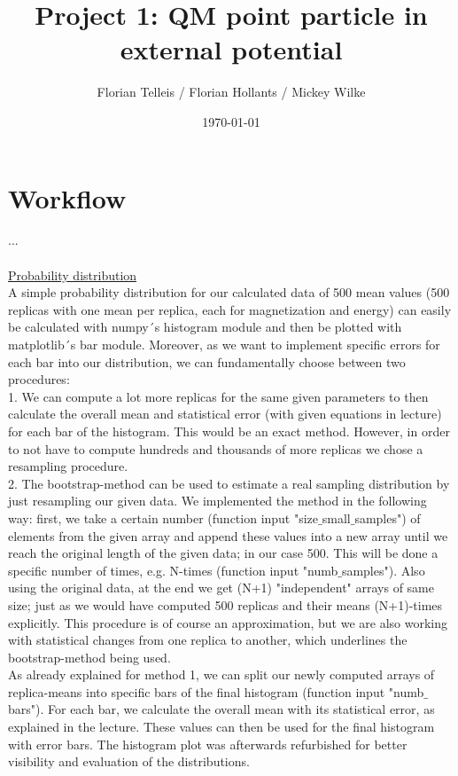 \documentclass[11pt, letterpaper, onecolumn]{article}
\title{Project 1: QM point particle in external potential}
\author{Florian Telleis / Florian Hollants / Mickey Wilke}
\date{\today}
\begin{document}
	
	
	\tableofcontents
	
	
	
	\vspace{1cm}
	
	
	
	\section{Workflow}
	...
	\\
	\\
	\underline{Probability distribution} \\
	A simple probability distribution for our calculated data of 500 mean values (500 replicas with one mean per replica, each for magnetization and energy) can easily be calculated with numpy´s histogram module and then be plotted with matplotlib´s bar module. Moreover, as we want to implement specific errors for each bar into our distribution, we can fundamentally choose between two procedures: \\
	1. We can compute a lot more replicas for the same given parameters to then calculate the overall mean and statistical error (with given equations in lecture) for each bar of the histogram. This would be an exact method. However, in order to not have to compute hundreds and thousands of more replicas we chose a resampling procedure. \\
	2. The bootstrap-method can be used to estimate a real sampling distribution by just resampling our given data. We implemented the method in the following way: first, we take a certain number (function input "size$\_$small$\_$samples") of elements from the given array and append these values into a new array until we reach the original length of the given data; in our case 500. This will be done a specific number of times, e.g. N-times (function input "numb$\_$samples"). Also using the original data, at the end we get (N+1) "independent" arrays of same size; just as we would have computed 500 replicas and their means (N+1)-times explicitly. This procedure is of course an approximation, but we are also working with statistical changes from one replica to another, which underlines the bootstrap-method being used. 
	\\
	As already explained for method 1, we can split our newly computed arrays of replica-means into specific bars of the final histogram (function input "numb$\_$bars"). For each bar, we calculate the overall mean with its statistical error, as explained in the lecture. These values can then be used for the final histogram with error bars. The histogram plot was afterwards refurbished for better visibility and evaluation of the distributions.
\end{document}
